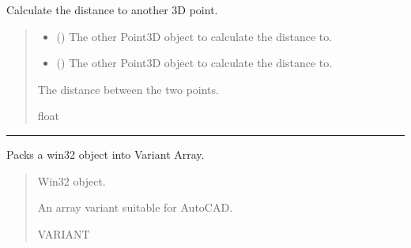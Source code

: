 \documentclass[a4paper,10pt,english]{sphinxmanual}
\begin{document}
\begin{fulllineitems}
\label{\detokenize{API:pyacad.APoint.distance}}
\pysigstartsignatures
{}
\pysigstopsignatures
\sphinxAtStartPar
Calculate the distance to another 3D point.
\begin{quote}\begin{description}
\begin{itemize}
\item {} 
\sphinxAtStartPar
{} () \textendash{} The other Point3D object to calculate the distance to.

\item {} 
\sphinxAtStartPar
{} () \textendash{} The other Point3D object to calculate the distance to.

\end{itemize}

\sphinxAtStartPar
The distance between the two points.

\sphinxAtStartPar
float

\end{description}\end{quote}

\end{fulllineitems}



\bigskip\hrule\bigskip

\label{\detokenize{API:module-pyacad.Types}}

\begin{fulllineitems}
\label{\detokenize{API:pyacad.Types.aDispatch}}
\pysigstartsignatures
{}
\pysigstopsignatures
\sphinxAtStartPar
Packs a win32 object into Variant Array.
\begin{quote}\begin{description}
\sphinxAtStartPar
{} \textendash{} Win32 object.

\sphinxAtStartPar
An array variant suitable for AutoCAD.

\sphinxAtStartPar
VARIANT

\end{description}\end{quote}

\end{fulllineitems}
\end{document}
